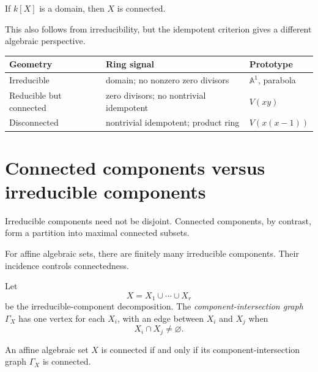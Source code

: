 \begin{corollary}
\label{cor:vi05-domain-connected}
If \(k[X]\) is a domain, then \(X\) is connected.
\end{corollary}

This also follows from irreducibility, but the idempotent criterion gives a different
algebraic perspective.




\begin{center}
\begin{tabular}{p{}p{}p{}}
\toprule
\textbf{Geometry} & \textbf{Ring signal} & \textbf{Prototype}\\
\midrule
Irreducible & domain; no nonzero zero divisors & \(\mathbb A^1\), parabola\\
Reducible but connected & zero divisors; no nontrivial idempotent & \(V(xy)\)\\
Disconnected & nontrivial idempotent; product ring & \(V(x(x-1))\)\\
\bottomrule
\end{tabular}
\end{center}

\section{Connected components versus irreducible components}

Irreducible components need not be disjoint.  Connected components, by contrast, form a
partition into maximal connected subsets.

For affine algebraic sets, there are finitely many irreducible components.  Their incidence
controls connectedness.

\begin{definition}
Let
\[
X=X_1\cup\cdots\cup X_r
\]
be the irreducible-component decomposition.  The \emph{component-intersection graph}
\(\Gamma_X\) has one vertex for each \(X_i\), with an edge between \(X_i\) and \(X_j\)
when
\[
X_i\cap X_j\neq\varnothing.
\]
\end{definition}

\begin{theorem}
\label{thm:vi05-intersection-graph}
An affine algebraic set \(X\) is connected if and only if its component-intersection graph
\(\Gamma_X\) is connected.
\end{theorem}

